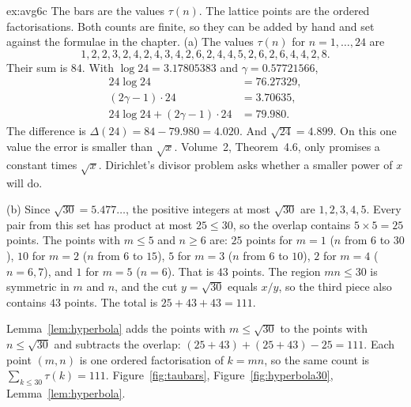 \begin{solution}{ex:avg6c}
\idea The bars are the values $\tau(n)$. The lattice points are the ordered factorisations. Both counts are finite, so they can be added by hand and set against the formulae in the chapter.
\writeup (a) The values $\tau(n)$ for $n=1,\ldots,24$ are
\[
1,2,2,3,2,4,2,4,3,4,2,6,2,4,4,5,2,6,2,6,4,4,2,8.
\]
Their sum is $84$. With $\log24=3.17805383$ and $\gamma=0.57721566$,
\begin{align*}
24\log24&=76.27329,\\
(2\gamma-1)\cdot24&=3.70635,\\
24\log24+(2\gamma-1)\cdot24&=79.980.
\end{align*}
The difference is $\Delta(24)=84-79.980=4.020$. And $\sqrt{24}=4.899$. On this one value the error is smaller than $\sqrt x$. Volume~2, Theorem~4.6, only promises a constant times $\sqrt x$. Dirichlet's divisor problem asks whether a smaller power of $x$ will do.

(b) Since $\sqrt{30}=5.477\ldots$, the positive integers at most $\sqrt{30}$ are $1,2,3,4,5$. Every pair from this set has product at most $25\le30$, so the overlap contains $5\times5=25$ points. The points with $m\le5$ and $n\ge6$ are: $25$ points for $m=1$ ($n$ from $6$ to $30$), $10$ for $m=2$ ($n$ from $6$ to $15$), $5$ for $m=3$ ($n$ from $6$ to $10$), $2$ for $m=4$ ($n=6,7$), and $1$ for $m=5$ ($n=6$). That is $43$ points. The region $mn\le30$ is symmetric in $m$ and $n$, and the cut $y=\sqrt{30}$ equals $x/y$, so the third piece also contains $43$ points. The total is $25+43+43=111$.

Lemma~\ref{lem:hyperbola} adds the points with $m\le\sqrt{30}$ to the points with $n\le\sqrt{30}$ and subtracts the overlap: $(25+43)+(25+43)-25=111$. Each point $(m,n)$ is one ordered factorisation of $k=mn$, so the same count is $\sum_{k\le30}\tau(k)=111$.
\tools Figure~\ref{fig:taubars}, Figure~\ref{fig:hyperbola30}, Lemma~\ref{lem:hyperbola}.
\end{solution}

